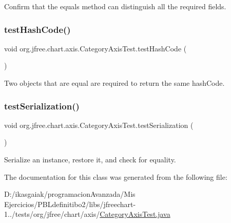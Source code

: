 Confirm that the equals method can distinguish all the required fields. \mbox{\label{classorg_1_1jfree_1_1chart_1_1axis_1_1_category_axis_test_a16b875cd6066e72eb719a90b20a24d3c}} 
\subsubsection{\texorpdfstring{test\+Hash\+Code()}{testHashCode()}}
{\footnotesize\ttfamily void org.\+jfree.\+chart.\+axis.\+Category\+Axis\+Test.\+test\+Hash\+Code (\begin{DoxyParamCaption}{ }\end{DoxyParamCaption})}

Two objects that are equal are required to return the same hash\+Code. \mbox{\label{classorg_1_1jfree_1_1chart_1_1axis_1_1_category_axis_test_a1c4ebc54ee8d55c8b8836fb21e0f2506}} 
\subsubsection{\texorpdfstring{test\+Serialization()}{testSerialization()}}
{\footnotesize\ttfamily void org.\+jfree.\+chart.\+axis.\+Category\+Axis\+Test.\+test\+Serialization (\begin{DoxyParamCaption}{ }\end{DoxyParamCaption})}

Serialize an instance, restore it, and check for equality. 

The documentation for this class was generated from the following file\+:\begin{DoxyCompactItemize}
\item 
D\+:/ikasgaiak/programacion\+Avanzada/\+Mis Ejercicios/\+P\+B\+Ldefinitibo2/libs/jfreechart-\/1../tests/org/jfree/chart/axis/\mbox{\hyperlink{_category_axis_test_8java}{Category\+Axis\+Test.\+java}}\end{DoxyCompactItemize}
